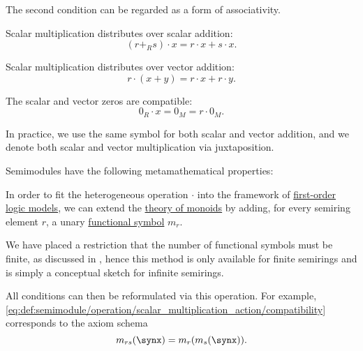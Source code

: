 \begin{definition}
\begin{thmenum}[series=def:semimodule]
\begin{thmenum}
      The second condition can be regarded as a form of associativity.

       Scalar multiplication distributes over scalar addition:
      \begin{equation}\label{eq:def:semimodule/operation/scalar_addition_distributivity}
        (r +_R s) \cdot x = r \cdot x + s \cdot x.
      \end{equation}

       Scalar multiplication distributes over vector addition:
      \begin{equation}\label{eq:def:semimodule/operation/vector_addition_distributivity}
        r \cdot (x + y) = r \cdot x + r \cdot y.
      \end{equation}

       The scalar and vector zeros are compatible:
      \begin{equation}\label{eq:def:semimodule/operation/absorption}
        0_R \cdot x = 0_M = r \cdot 0_M.
      \end{equation}
    \end{thmenum}

    In practice, we use the same symbol for both scalar and vector addition, and we denote both scalar and vector multiplication via juxtaposition.
  \end{thmenum}

  Semimodules have the following metamathematical properties:
  \begin{thmenum}[resume=def:semimodule]
    \mimprovised In order to fit the heterogeneous operation \( \cdot \) into the framework of \hyperref[def:first_order_model]{first-order logic models}, we can extend the \hyperref[def:monoid/theory]{theory of monoids} by adding, for every semiring element \( r \), a unary \hyperref[def:first_order_language/fun]{functional symbol} \( m_r \).

    We have placed a restriction that the number of functional symbols must be finite, as discussed in , hence this method is only available for finite semirings and is simply a conceptual sketch for infinite semirings.

    All conditions can then be reformulated via this operation. For example, \eqref{eq:def:semimodule/operation/scalar_multiplication_action/compatibility} corresponds to the axiom schema
    \begin{equation*}
      m_{rs}(\synx) = m_r(m_s(\synx)).
    \end{equation*}


\end{thmenum}
\end{definition}
